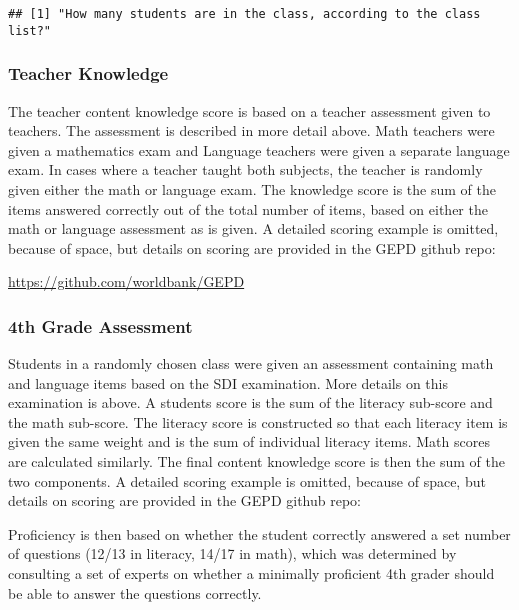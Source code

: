 \documentclass[]{article}
\newenvironment{Shaded}{\begin{snugshade}}{\end{snugshade}}
\newcommand{\KeywordTok}[1]{\textcolor[rgb]{0.13,0.29,0.53}{\textbf{#1}}}
\newcommand{\NormalTok}[1]{#1}
\newcommand{\OperatorTok}[1]{\textcolor[rgb]{0.81,0.36,0.00}{\textbf{#1}}}
\begin{document}
\begin{Shaded}
\end{Shaded}

\begin{verbatim}
## [1] "How many students are in the class, according to the class list?"
\end{verbatim}

\hypertarget{teacher-knowledge}{%
\subsubsection{Teacher Knowledge}\label{teacher-knowledge}}

The teacher content knowledge score is based on a teacher assessment
given to teachers. The assessment is described in more detail above.
Math teachers were given a mathematics exam and Language teachers were
given a separate language exam. In cases where a teacher taught both
subjects, the teacher is randomly given either the math or language
exam. The knowledge score is the sum of the items answered correctly out
of the total number of items, based on either the math or language
assessment as is given. A detailed scoring example is omitted, because
of space, but details on scoring are provided in the GEPD github repo:

\url{https://github.com/worldbank/GEPD}

\hypertarget{th-grade-assessment}{%
\subsubsection{4th Grade Assessment}\label{th-grade-assessment}}

Students in a randomly chosen class were given an assessment containing
math and language items based on the SDI examination. More details on
this examination is above. A students score is the sum of the literacy
sub-score and the math sub-score. The literacy score is constructed so
that each literacy item is given the same weight and is the sum of
individual literacy items. Math scores are calculated similarly. The
final content knowledge score is then the sum of the two components. A
detailed scoring example is omitted, because of space, but details on
scoring are provided in the GEPD github repo:

Proficiency is then based on whether the student correctly answered a
set number of questions (12/13 in literacy, 14/17 in math), which was
determined by consulting a set of experts on whether a minimally
proficient 4th grader should be able to answer the questions correctly.
\end{document}
